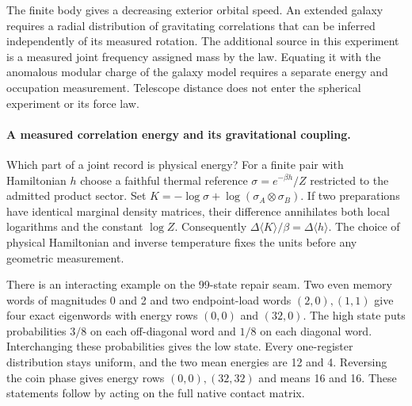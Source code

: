 \documentclass[11pt]{article}
\begin{document}
The finite body gives a decreasing exterior orbital speed. An extended
galaxy requires a radial distribution of gravitating correlations that
can be inferred independently of its measured rotation. The additional
source in this experiment is a measured joint frequency assigned mass by
the law. Equating it with the anomalous modular charge of the galaxy
model requires a separate energy and occupation measurement. Telescope
distance does not enter the spherical experiment or its force law.

\paragraph{A measured correlation energy and its gravitational coupling.}
\label{par:seam-energy-test}
Which part of a joint record is physical energy? For a finite pair
with Hamiltonian $h$ choose a faithful thermal reference
$\sigma=e^{-\beta h}/Z$ restricted to the admitted product sector.
Set $K=-\log\sigma+\log(\sigma_A\otimes\sigma_B)$.
If two preparations have identical marginal density matrices, their
difference annihilates both local logarithms and the constant $\log Z$.
Consequently $\Delta\langle K\rangle/\beta=\Delta\langle h\rangle$.
The choice of physical Hamiltonian and inverse temperature fixes the
units before any geometric measurement.

There is an interacting example on the 99-state repair seam. Two even
memory words of magnitudes 0 and 2 and two endpoint-load words
$(2,0),(1,1)$ give four exact eigenwords with energy rows $(0,0)$ and
$(32,0)$. The high state puts probabilities $3/8$ on each off-diagonal
word and $1/8$ on each diagonal word. Interchanging these probabilities
gives the low state. Every one-register distribution stays uniform,
and the two mean energies are 12 and 4. Reversing the coin phase gives
energy rows $(0,0),(32,32)$ and means 16 and 16. These statements
follow by acting on the full native contact matrix.
\end{document}
